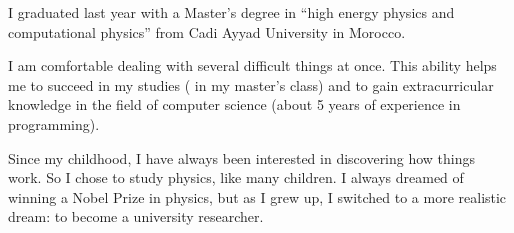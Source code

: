 \documentclass[11pt, a4paper]{awesome-cv}
\begin{document}
\begin{cvletter}
%
%
%
%
%
%
%
%
%
%



I graduated last year with a Master’s degree in “high energy physics and computational physics” from Cadi Ayyad University in Morocco.

I am comfortable dealing with several difficult things at once. This ability helps me to succeed in my studies (    in my master's class) and to gain extracurricular knowledge in the field of computer science (about 5 years of experience in programming).

Since my childhood, I have always been interested in discovering how things work. So I chose to study physics, like many children. I always dreamed of winning a Nobel Prize in physics, but as I grew up, I switched to a more realistic dream: to become a university researcher.


\end{cvletter}
\end{document}
